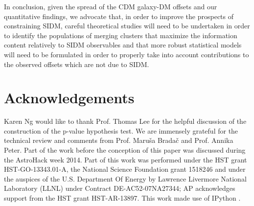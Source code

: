 \documentclass[usenatbib]{mn2e}
\newcommand{\offset}{\Delta {\bf s}}
\newcommand{\SIDM}{{\rm SIDM}}
\begin{document}
{In conclusion, given the spread of the CDM galaxy-DM offsets and our quantitative findings, 
we advocate that, in order to improve the prospects of constraining SIDM, careful theoretical studies will need to be undertaken in order to identify the populations of merging clusters that maximize the information content relatively to SIDM observables and that more robust statistical models will need to be formulated in order to properly take into account contributions to the observed offsets which are not due to SIDM.





\section{Acknowledgements}
Karen Ng would like to thank Prof. Thomas Lee for the helpful discussion of 
the construction of the p-value hypothesis test. We are immensely grateful for 
the technical review and comments from Prof. Maru\v{s}a Brada\v{c} and Prof. Annika Peter.  
Part of the work before the conception of this paper was discussed during 
the AstroHack week 2014. Part of this work was performed under the HST grant
HST-GO-13343.01-A, the National Science Foundation grant 
1518246 and under the auspices of the U.S. Department Of Energy by 
Lawrence Livermore National Laboratory (LLNL) 
under Contract DE-AC52-07NA27344;  AP acknowledges support from the HST grant HST-AR-13897.
This work made use of {\sc IPython}
\citep{Perez2007}.


}
\end{document}
